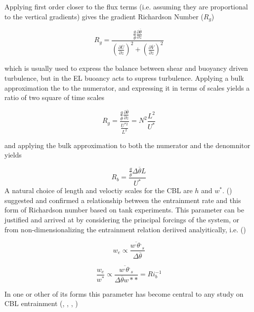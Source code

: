Applying first order closer to the flux terms (i.e. assuming they are proportional to the vertical gradients)  gives the gradient Richardson Number ($R_{g}$)

\begin{equation}
R_{g} = \frac{ \frac{g}{\overline{\theta}} \frac{\partial \overline{\theta}}{\partial z}}{\left( \frac{ \partial \overline{U}}{\partial z} \right)^{2} + \left( \frac{\partial \overline{V}}{\partial z} \right)^{2}} 
\end{equation}

which is usually used to express the balance between shear and buoyancy driven turbulence, but in the \acs{EL} buoancy acts to supress turbulence.  
Applying a bulk approximation the to the numerator, and expressing it in terms of scales yields a ratio of two square of time scales

\begin{equation}
R_{g} = \frac{\frac{g}{\overline{\theta}} \frac{\partial \overline{\theta}}{\partial z}}{\frac{U^{*2}}{L^{2}}} = N^{2}\frac{L^{2}}{U^{*}}
\end{equation}


and applying the bulk approximation to both the numerator and the denomnitor yields

\begin{equation}
R_{b} = \frac{\frac{g}{\overline{\theta}} \Delta \overline{\theta} L}{U^{*}}
\end{equation}
A natural choice of length and veloctiy scales for the \acs{CBL} are $h$ and $w^{*}$.  \citeauthor{EllTurn} (\cite{EllTurn}) suggested and confirmed a relationship between the entrainment rate and this form of 
Richardson number based on tank experiments.  This parameter can be justified and arrived at by considering the principal forcings of the system, or from non-dimensionalizing the entrainment relation  deriived
analyitically, i.e. (\cite{Deardorff72})

\begin{equation}
w_{e} \propto \frac{\overline{w^{,}\theta^{,}}_{s}}{\Delta \overline{\theta}}
\end{equation}

\begin{equation}
\frac{w_{e}}{w^{*}} \propto  \frac{\overline{w^{,}\theta^{,}}_{s}}{\Delta \overline{\theta} w*{*}} = Ri_{b}^{-1}
\end{equation}
 

In one or other of its forms this parameter has become central to any study on \acs{CBL} entrainment (\cite{SullMoengStev}, \cite{FedConzMir04}, \cite{Traum11}, \cite{BrooksFowler2})


